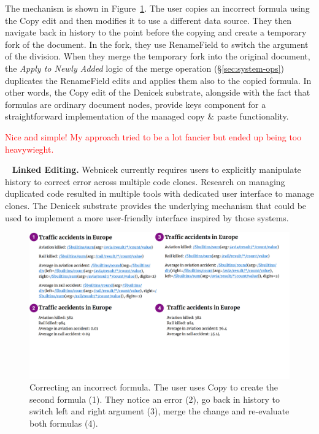 \documentclass[sigconf,anonymous,screen]{acmart}
\newcommand{\ident}[1]{{\sffamily #1}}
\newcommand{\note}[1]{\textcolor{red}{#1}}
\DeclareRobustCommand{\keyideabox}[3]{\begin{tcolorbox}[breakable,
  boxsep=5pt,left=0pt,right=0pt,top=0pt,bottom=0pt,width=\dimexpr\columnwidth\relax,
  colback=gray!20,colframe=gray!20,
  enlarge bottom by=0pt,enlarge top by=0pt,
  arc=0pt,outer arc=0pt]
\lettrine[lraise=0.3]{\LARGE #1}{~}
\small \textbf{#2.} #3
\end{tcolorbox}
}
\begin{document}
The mechanism is shown in Figure~\ref{fig:copypaste}. The user copies an incorrect formula using
the \ident{Copy} edit and then modifies it to use a different data source. They then navigate back
in history to the point before the copying and create a temporary fork of the document. In the
fork, they use \ident{RenameField} to switch the argument of the division. When they merge the
temporary fork into the original document, the \emph{Apply to Newly Added} logic of the merge
operation (\S\ref{sec:system-ops}) duplicates the \ident{RenameField} edits and applies them also
to the copied formula. In other words, the \ident{Copy} edit of the Denicek substrate, alongside
with the fact that formulas are ordinary document nodes, provide keys component for a
straightforward implementation of the managed copy \& paste functionality.

\note{Nice and simple! My approach tried to be a lot fancier but ended up being too heavywieght. }

\keyideabox{\faClipboard}{Linked Editing}{Webnicek currently requires users to explicitly
manipulate history to correct error across multiple code clones. Research on managing duplicated
code resulted in multiple tools \cite{toomim-2004-linked,duala-ekoko-2008-clone} with dedicated
user interface to manage clones. The Denicek substrate provides the underlying mechanism that
could be used to implement a more user-friendly interface inspired by those systems.}


\begin{figure}[t]
\includegraphics[width=1\columnwidth,clip,trim=0cm 5.5cm 1cm 0cm]{fig/copypaste.pdf}
\vspace{-1.5em}
\caption{Correcting an incorrect formula. The user uses Copy to create the second
formula (1). They notice an error (2), go back in history to switch left and right argument (3),
merge the change and re-evaluate both formulas (4).}
\label{fig:copypaste}
\vspace{-0.5em}
\end{figure}
\end{document}
